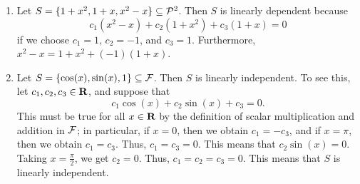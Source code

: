 \documentclass{homework}
\begin{document}
	\question
	\begin{enumerate}
		\item Let $S = \{1 + x^2, 1+x, x^2 - x\}\subseteq \mathcal{P}^2$. Then $S$ is linearly dependent because
		\begin{equation*}
			c_1(x^2-x) + c_2(1+x^2) + c_3(1+x) = 0
		\end{equation*}
		if we choose $c_1 = 1$, $c_2 = -1$, and $c_3 = 1$. Furthermore, $x^2-x = 1+x^2 + (-1)(1+x)$.
		
		\item Let $S = \{\cos(x), \sin(x), 1\} \subseteq \mathcal{F}$. Then $S$ is linearly independent. To see this, let $c_1,c_2,c_3 \in \textnormal{\bf R}$, and suppose that
		\begin{equation*}
			c_1\cos(x) + c_2\sin(x) + c_3 = 0.
		\end{equation*}
		This must be true for all $x\in \textnormal{\bf R}$ by the definition of scalar multiplication and addition in $\mathcal{F}$; in particular, if $x = 0$, then we obtain $c_1 = -c_3$, and if $x =\pi$, then we obtain $c_1 = c_3$. Thus, $c_1 = c_3 = 0$. This means that $c_2\sin(x) = 0$. Taking $x = \frac{\pi}{2}$, we get $c_2 = 0$. Thus, $c_1 =c_2=c_3 = 0$. This means that $S$ is linearly independent.
	\end{enumerate}
	
	\question
	
	\question 
	
\end{document}

